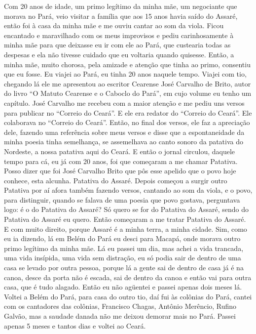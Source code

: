 Com 20 anos de idade, um primo legítimo da minha mãe, um negociante que
morava no Pará, veio visitar a família que aos 15 anos havia saído do
Assaré, então foi à casa da minha mãe e me ouviu cantar ao som da viola.
Ficou encantado e maravilhado com os meus improvisos e pediu
carinhosamente à minha mãe para que deixasse eu ir com ele ao Pará, que
custearia todas as despesas e ela não tivesse cuidado que eu voltaria
quando quisesse. Então, a minha mãe, muito chorosa, pela amizade e
atenção que tinha ao primo, consentiu que eu fosse. Eu viajei ao Pará,
eu tinha 20 anos naquele tempo. Viajei com tio, chegando lá ele me
apresentou ao escritor Cearense José Carvalho de Brito, autor do livro
``O Matuto Cearense e o Caboclo do Pará'', em cujo volume eu tenho um
capítulo. José Carvalho me recebeu com a maior atenção e me pediu uns
versos para publicar no ``Correio do Ceará''. E ele era redator do
``Correio do Ceará''. Ele colaborava no ``Correio do Ceará''. Então, no
final dos versos, ele faz a apreciação dele, fazendo uma referência
sobre meus versos e disse que a espontaneidade da minha poesia tinha
semelhança, se assemelhava ao canto sonoro da patativa do Nordeste, a
nossa patativa aqui do Ceará. E então o jornal circulou, daquele tempo
para cá, eu já com 20 anos, foi que começaram a me chamar Patativa.
Posso dizer que foi José Carvalho Brito que pôs esse apelido que o povo
hoje conhece, esta alcunha. Patativa do Assaré. Depois começou a surgir
outro Patativa por aí afora também fazendo versos, cantando ao som da
viola, e o povo, para distinguir, quando se falava de uma poesia que
povo gostava, perguntava logo: é o do Patativa do Assaré? Só quero se
for do Patativa do Assaré, sendo do Patativa do Assaré eu quero. Então
começaram a me tratar Patativa do Assaré. E com muito direito, porque
Assaré é a minha terra, a minha cidade. Sim, como eu ia dizendo, lá em
Belém do Pará eu desci para Macapá, onde morava outro primo legítimo
da minha mãe. Lá eu passei um dia, mas achei a vida trancada, uma vida
insípida, uma vida sem distração, eu só podia sair de dentro de uma casa
se levado por outra pessoa, porque lá a gente sai de dentro de casa já é
na canoa, desce da porta não é escada, sai de dentro da canoa e então
vai para outra casa, que é tudo alagado. Então eu não agüentei e
passei apenas dois meses lá. Voltei a Belém do Pará, para casa do outro
tio, daí fui às colônias do Pará, cantei com os cantadores das colônias,
Francisco Chagas, Antônio Merêncio, Rufino Galvão, mas a saudade danada
não me deixou demorar mais no Pará. Passei apenas 5 meses e tantos dias
e voltei ao Ceará.


